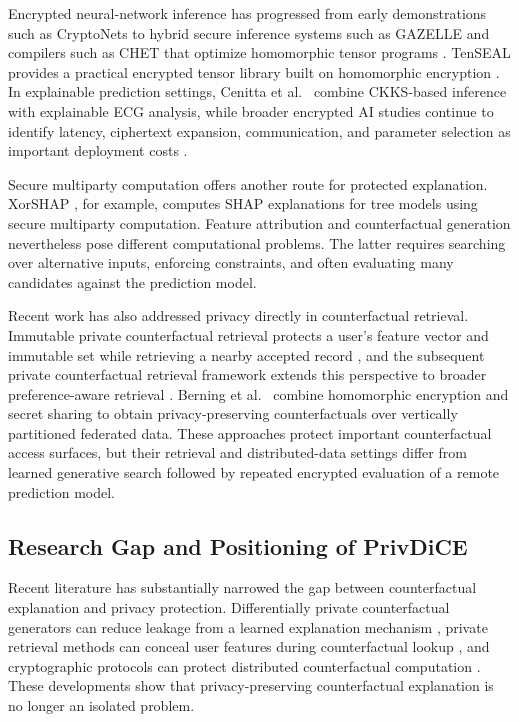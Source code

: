 \documentclass[preprint,12pt]{elsarticle}
\begin{document}
Encrypted neural-network inference has progressed from early demonstrations
such as CryptoNets \cite{giladbachrach2016cryptonets} to hybrid secure
inference systems such as GAZELLE \cite{juvekar2018gazelle} and compilers such
as CHET that optimize homomorphic tensor programs
\cite{dathathri2019chet}. TenSEAL provides a practical encrypted tensor
library built on homomorphic encryption \cite{benaissa2021tenseal}. In
explainable prediction settings, Cenitta et al.~\cite{cenitta2025ecghe}
combine CKKS-based inference with explainable ECG analysis, while broader
encrypted AI studies continue to identify latency, ciphertext expansion,
communication, and parameter selection as important deployment costs
\cite{magni2025fhe}.

Secure multiparty computation offers another route for protected explanation.
XorSHAP \cite{jetchev2023xorshap}, for example, computes SHAP explanations for
tree models using secure multiparty computation. Feature attribution and
counterfactual generation nevertheless pose different computational problems.
The latter requires searching over alternative inputs, enforcing constraints,
and often evaluating many candidates against the prediction model.

Recent work has also addressed privacy directly in counterfactual retrieval.
Immutable private counterfactual retrieval protects a user's feature vector and
immutable set while retrieving a nearby accepted record
\cite{meel2025ipcr}, and the subsequent private counterfactual retrieval
framework extends this perspective to broader preference-aware retrieval
\cite{meel2026pcr}. Berning et al.~\cite{berning2026ppcfe} combine homomorphic
encryption and secret sharing to obtain privacy-preserving counterfactuals over
vertically partitioned federated data. These approaches protect important
counterfactual access surfaces, but their retrieval and distributed-data
settings differ from learned generative search followed by repeated encrypted
evaluation of a remote prediction model.

\subsection{Research Gap and Positioning of PrivDiCE}
\label{subsec:gap_positioning}

Recent literature has substantially narrowed the gap between counterfactual
explanation and privacy protection. Differentially private counterfactual
generators can reduce leakage from a learned explanation mechanism
\cite{ezzeddine2026privatecf}, private retrieval methods can conceal user
features during counterfactual lookup \cite{meel2025ipcr,meel2026pcr}, and
cryptographic protocols can protect distributed counterfactual computation
\cite{berning2026ppcfe}. These developments show that privacy-preserving
counterfactual explanation is no longer an isolated problem.
\end{document}
